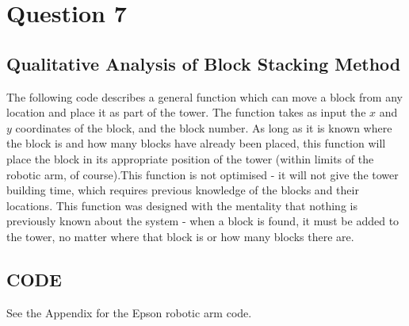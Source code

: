 \newpage
\section{Question 7}
	\subsection{Qualitative Analysis of Block Stacking Method}
	The following code describes a general function which can move a block from any location and place it as part of the tower. The function takes as input the $ x $ and $ y $ coordinates of the block, and the block number. As long as it is known where the block is and how many blocks have already been placed, this function will place the block in its appropriate position of the tower (within limits of the robotic arm, of course).\newline This function is not optimised - it will not give the tower building time, which requires previous knowledge of the blocks and their locations. This function was designed with the mentality that nothing is previously known about the system - when a block is found, it must be added to the tower, no matter where that block is or how many blocks there are.\newline
	\subsection{CODE}
	See the Appendix for the Epson robotic arm code.